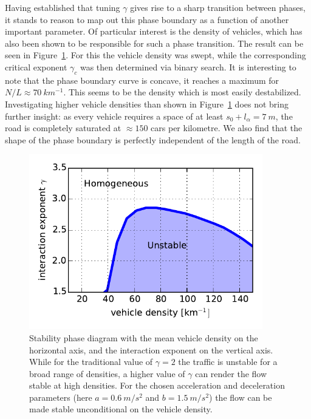 Having established that tuning $\gamma$ gives rise to a sharp transition between phases, it stands to reason to map out this phase boundary as a function of another important parameter. Of particular interest is the density of vehicles, which has also been shown to be responsible for such a phase transition. The result can be seen in Figure~\ref{fig:phase_diagram}. For this the vehicle density was swept, while the corresponding critical exponent $\gamma_c$ was then determined via binary search. It is interesting to note that the phase boundary curve is concave, it reaches a maximum for $N/L \approx \SI{70}{km^{-1}}$. This seems to be the density which is most easily destabilized. Investigating higher vehicle densities than shown in Figure~\ref{fig:phase_diagram} does not bring further insight: as every vehicle requires a space of at least $s_0+l_\alpha= \SI{7}{m}$, the road is completely saturated at $\approx 150$ cars per kilometre. We also find that the shape of the phase boundary is perfectly independent of the length of the road.
\begin{figure}
    \centering
    \includegraphics[width=4in]{../img/phase_diagram.pdf}
    \caption{Stability phase diagram with the mean vehicle density on the horizontal axis, and the interaction exponent on the vertical axis. While for the traditional value of $\gamma=2$ the traffic is unstable for a broad range of densities, a higher value of $\gamma$ can render the flow stable at high densities. For the chosen acceleration and deceleration parameters (here $a=\SI{0.6}{m/s^2}$ and $b=\SI{1.5}{m/s^2}$) the flow can be made stable unconditional on the vehicle density.}
    \label{fig:phase_diagram}
\end{figure}


